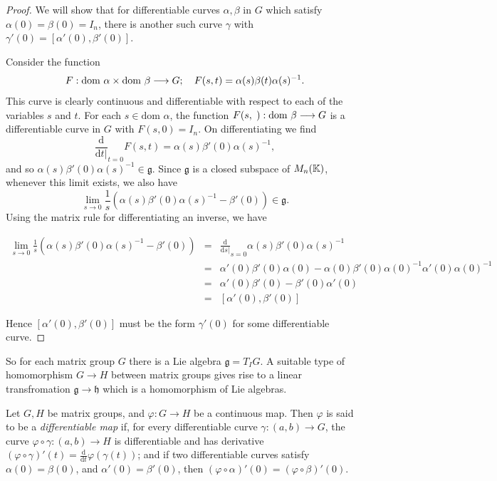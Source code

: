 \begin{proof}
  We will show that for differentiable curves \(\alpha,\beta\) in \(G\) which satisfy
  \(\alpha(0)=\beta(0)=I_n\), there is another such curve \(\gamma\) with \(\gamma'(0)=[\alpha'(0),\beta'(0)]\).

  Consider the function
  \[ F:\text{dom }\alpha\times\text{dom }\beta\longrightarrow G;\hspace{10px}F(s,t)=\alpha(s)\beta(t)\alpha(s)^{-1}. \]
  This curve is clearly continuous and differentiable with respect to each of the variables
  \(s\) and \(t\). For each \(s\in\text{dom }\alpha\), the function \(F(s,\hspace{3px}):\text{dom }\beta\longrightarrow G\)
  is a differentiable curve in \(G\) with \(F(s,0)=I_n\). On differentiating we find
  \[\frac{\text{d}}{\text{d}t|}_{t=0}F(s,t)=\alpha(s)\beta'(0)\alpha(s)^{-1}, \]
  and so \(\alpha(s)\beta'(0)\alpha(s)^{-1} \in \mathfrak{g}\). Since \(\mathfrak{g}\) is a
  closed subspace of \(M_n(\mathbb{K})\), whenever this limit exists, we also have
  \[ \lim_{s\rightarrow 0}\frac{1}{s}(\alpha(s)\beta'(0)\alpha(s)^{-1}-\beta'(0))\in\mathfrak{g}. \]
  Using the matrix rule for differentiating an inverse, we have

  \begin{eqnarray*}
    \lim_{s\rightarrow0}\frac{1}{s}(\alpha(s)\beta'(0)\alpha(s)^{-1}-\beta'(0))
    &=& \frac{\text{d}}{\text{d}s|}_{s=0} \alpha(s)\beta'(0)\alpha(s)^{-1} \\
    &=& \alpha'(0)\beta'(0)\alpha(0)-\alpha(0)\beta'(0)\alpha(0)^{-1}\alpha'(0)\alpha(0)^{-1} \\
    &=& \alpha'(0)\beta'(0)-\beta'(0)\alpha'(0) \\
    &=& [\alpha'(0),\beta'(0)]
  \end{eqnarray*}

  Hence \([\alpha'(0),\beta'(0)]\) must be the form \(\gamma'(0)\) for some differentiable curve.
\end{proof}

So for each matrix group \(G\) there is a Lie algebra \(\mathfrak{g}=T_IG\). A suitable type
of homomorphism \(G\longrightarrow H\) between matrix groups gives rise to a linear
transfromation \(\mathfrak{g}\longrightarrow\mathfrak{h}\) which is a homomorphism of Lie
algebras.

\begin{definition}
  Let \(G,H\) be matrix groups, and \(\varphi:G\longrightarrow H\) be a continuous map.
  Then \(\varphi\) is said to be a {\it differentiable map} if, for every differentiable curve
  \(\gamma:(a,b)\longrightarrow G\), the curve \(\varphi\circ\gamma:(a,b)\longrightarrow H\)
  is differentiable and has derivative \((\varphi\circ\gamma)'(t)=\frac{\text{d}}{\text{d}t}\varphi(\gamma(t))\);
  and if two differentiable curves satisfy \(\alpha(0)=\beta(0)\), and \(\alpha'(0)=\beta'(0)\),
  then \((\varphi\circ\alpha)'(0)=(\varphi\circ\beta)'(0)\).
\end{definition}

